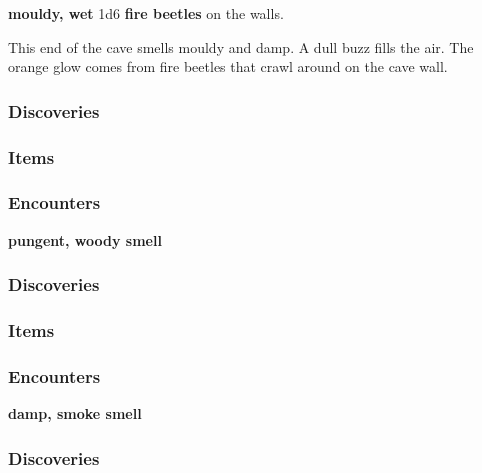 \textbf{mouldy, wet}
1d6 \textbf{fire beetles} on the walls.
\begin{DndReadAloud}
	This end of the cave smells mouldy and damp. A dull buzz fills the air. The
	orange glow comes from fire beetles that crawl around on the cave wall.
\end{DndReadAloud}
\subsubsection{Discoveries}
\begin{itemize}
\end{itemize}
\subsubsection{Items}
\begin{itemize}
\end{itemize}
\subsubsection{Encounters}
\begin{itemize}
\end{itemize}

\textbf{pungent, woody smell}
\begin{DndReadAloud}
\end{DndReadAloud}
\subsubsection{Discoveries}
\begin{itemize}
\end{itemize}
\subsubsection{Items}
\begin{itemize}
\end{itemize}
\subsubsection{Encounters}
\begin{itemize}
\end{itemize}

\textbf{damp, smoke smell}
\begin{DndReadAloud}
\end{DndReadAloud}
\subsubsection{Discoveries}
\begin{itemize}
\end{itemize}
